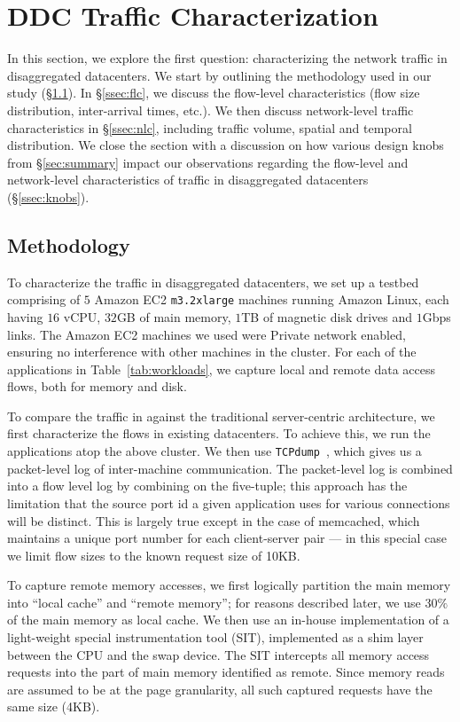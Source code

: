 \section{DDC Traffic Characterization}
\label{sec:workloads}
In this section, we explore the first question: characterizing the network traffic in disaggregated datacenters. We start by outlining the methodology used in our study (\S\ref{ssec:method1}). In \S\ref{ssec:flc}, we discuss the flow-level characteristics (flow size distribution, inter-arrival times, etc.). We then discuss network-level traffic characteristics in \S\ref{ssec:nlc}, including traffic volume, spatial and temporal distribution. We close the section with a discussion on how various design knobs from \S\ref{sec:summary} impact our observations regarding the flow-level and network-level characteristics of traffic in disaggregated datacenters (\S\ref{ssec:knobs}).

\subsection{Methodology}
\label{ssec:method1} 
To characterize the traffic in disaggregated datacenters, we set up a testbed comprising of $5$ Amazon EC2 \texttt{m3.2xlarge} machines running Amazon Linux, each having $16$ vCPU, $32$GB of main memory, $1$TB of magnetic disk drives and $1$Gbps links. The Amazon EC2 machines we used were Private network enabled, ensuring no interference with other machines in the cluster. For each of the applications in Table~\ref{tab:workloads}, we capture local and remote data access flows, both for memory and disk.

To compare the traffic in \dis against the traditional server-centric architecture, we first characterize the flows in existing datacenters. To achieve this, we run the applications atop the above cluster. We then use {\tt TCPdump}~\cite{tcpdump}, which gives us a packet-level log of inter-machine communication. The packet-level log is combined into a flow level log by combining on the five-tuple; this approach has the limitation that the source port id a given application uses for various connections will be distinct. This is largely true except in the case of memcached, which maintains a unique port number for each client-server pair --- in this special case we limit flow sizes to the known request size of 10KB.

To capture remote memory accesses, we first logically partition the main memory into ``local cache'' and ``remote memory''; for reasons described later, we use $30\%$ of the main memory as local cache. We then use an in-house implementation of a light-weight special instrumentation tool (SIT), implemented as a shim layer between the CPU and the swap device. The SIT intercepts all memory access requests into the part of main memory identified as remote. Since memory reads are assumed to be at the page granularity, all such captured requests have the same size (4KB).  

